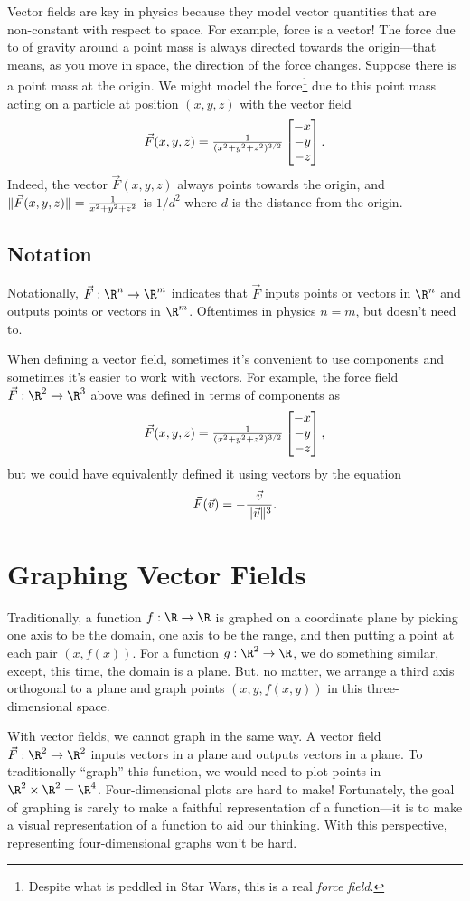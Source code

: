 Vector fields are key in physics because they model
vector quantities that are non-constant with respect to
space.  For example, force is a vector!  The force due to of gravity
around a point mass is always directed towards the origin---that
means, as you move in space, the direction of the force 
changes.  Suppose there is a point mass at the origin.
We might model the force\footnote{ Despite what is peddled in
Star Wars, this is a real \emph{force field}.} due to this point mass acting on a particle
at position $(x,y,z)$ with the vector field
\[
	\vec F(x,y,z) = \tfrac{1}{(x^2+y^2+z^2)^{3/2}}\mat{-x\\-y\\-z}.
\]
Indeed, the vector $\vec F(x,y,z)$ always points towards the origin,
and $\lVert\vec F(x,y,z)\rVert=\frac{1}{x^2+y^2+z^2}$ is $1/d^2$ where $d$
is the distance from the origin.


\subsection{Notation}
Notationally, $\vec F:\R^n\to\R^m$ indicates that $\vec F$ inputs points or vectors in $\R^n$
and outputs points or vectors in $\R^m$.  Oftentimes in physics $n=m$, but doesn't need to.

When defining a vector field, sometimes it's convenient to use components
and sometimes it's easier to work with vectors.  For example, the force field
$\vec F:\R^2\to\R^3$ above was defined in terms of components as
\[
	\vec F(x,y,z) = \tfrac{1}{(x^2+y^2+z^2)^{3/2}}\mat{-x\\-y\\-z},
\]
but we could have equivalently defined it using vectors by the equation
\[
	\vec F(\vec v) = -\frac{\vec v}{\lVert\vec v\rVert^3}.
\]


\section{Graphing Vector Fields}

Traditionally, a function $f:\R\to\R$ is graphed on a coordinate
plane by picking one axis to be the domain, one
axis to be the range, and then putting a point at each pair $(x,f(x))$.
For a function $g:\R^2\to\R$, we do something similar, except, this time,
the domain is a plane.  But, no matter, we arrange a third axis orthogonal
to a plane and graph points $(x,y,f(x,y))$ in this three-dimensional space.

With vector fields, we cannot graph in the same way.  A vector field
$\vec F:\R^2\to\R^2$ inputs vectors in a plane and outputs vectors in
a plane. To traditionally ``graph'' this function, we would need to
plot points in $\R^2\times\R^2=\R^4$.  Four-dimensional plots are hard to make!
Fortunately, the goal of graphing is rarely to make a faithful representation
of a function---it is to make a visual representation of a function
to aid our thinking.  With this perspective, representing four-dimensional
graphs won't be hard.

